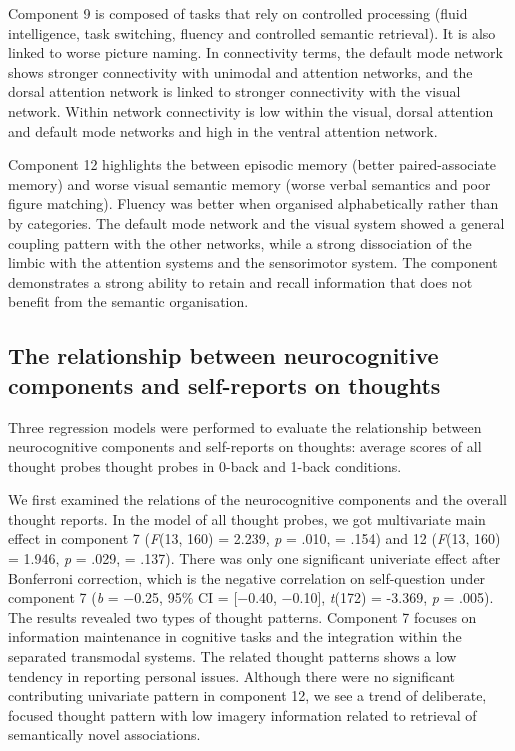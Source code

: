 Component 9 is composed of tasks that rely on controlled processing (fluid intelligence, task switching, fluency and controlled semantic retrieval). It is also linked to worse picture naming. In connectivity terms, the default mode network shows stronger connectivity with unimodal and attention networks, and the dorsal attention network is linked to stronger connectivity with the visual network. Within network connectivity is low within the visual, dorsal attention and default mode networks and high in the ventral attention network. 

Component 12 highlights the between episodic memory (better paired-associate memory) and worse visual semantic memory (worse verbal semantics and poor figure matching). Fluency was better when organised alphabetically rather than by categories. The default mode network and the visual system showed a general coupling pattern with the other networks, while a strong dissociation of the limbic with the attention systems and the sensorimotor system. The component demonstrates a strong ability to retain and recall information that does not benefit from the semantic organisation.

\subsection{The relationship between neurocognitive components and self-reports on thoughts}

Three regression models were performed to evaluate the relationship between neurocognitive components and self-reports on thoughts: average scores of all thought probes thought probes in 0-back and 1-back conditions. 

We first examined the relations of the neurocognitive components and the overall thought reports. In the model of all thought probes, we got multivariate main effect in component 7 (\textit{F}(13, 160) = 2.239, \textit{p} = .010, \paretasquared = .154)
and 12 (\textit{F}(13, 160) = 1.946, \textit{p} = .029, \paretasquared = .137). There was only one significant univeriate effect after Bonferroni correction, which is the negative correlation on self-question under component 7 
(\textit{b} = −0.25, 95\% CI = [−0.40, −0.10], \textit{t}(172) = -3.369, \textit{p} = .005). The results revealed two types of thought patterns. Component 7 focuses on information maintenance in cognitive tasks and the integration within the separated transmodal systems. The related thought patterns shows a low tendency in reporting personal issues. Although there were no significant contributing univariate pattern in component 12, we see a trend of deliberate, focused thought pattern with low imagery information related to retrieval of semantically novel associations.

